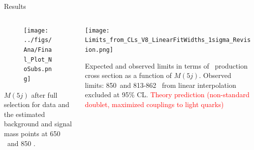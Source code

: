 \begin{frame}{Results}
\vspace{-.6cm}

\begin{columns}
\begin{column}{.50\textwidth}\tiny
\begin{figure}[!Hhtbp]
  \begin{center}
    \texttt{[image: ../figs/Ana/Final\_Plot\_NoSubs.png]}
  \end{center}
\end{figure}
\vspace{-.2cm}
\begin{block}{}\tiny
$M(5j)$ after full selection for data and the estimated background and signal mass points at 650 \GeVcc~and 850 \GeVcc.
\end{block}
\end{column}

\begin{column}{.50\textwidth}\tiny
  \begin{center}
    \texttt{[image: Limits\_from\_CLs\_V8\_LinearFitWidths\_1sigma\_Revision.png]}
  \end{center}
\vspace{-.2cm}
\begin{block}{}\tiny
Expected and observed limits in terms of \Tp~production cross section as a function of $M(5j)$. Observed limits: 850~\GeVcc and 813-862 \GeVcc~from linear interpolation excluded at 95\% CL. \textcolor{red}{Theory prediction (non-standard doublet, maximized couplings to light quarks)}
\end{block}
\end{column}

\end{columns}

\end{frame}




